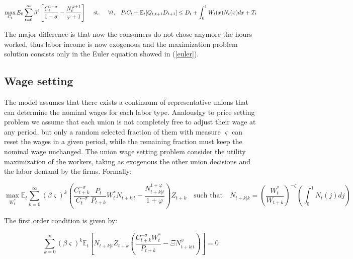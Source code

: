 \documentclass{article}
\newcommand{\Et}{\mathbb{E}_t}
\begin{document}
\begin{equation}
    \max_{C_t} E_0 \sum^\infty_{t=0} \beta^t \left[\frac{C_t^{1-\sigma}}{1-\sigma} - \frac{N_t^{\varphi+1}}{\varphi+1} \right] \hspace{1em}  \textrm{ st. } \hspace{1em} \forall t, \hspace{0.8em} P_t C_t + \Et[Q_{t,t+1} D_{t+1}] \leq D_t +  \int^1_0 W_t(x) N_t(x) dx + T_t
\end{equation}

The major difference is that now the consumers do not chose anymore the hours worked, thus labor income is now exogenous and the maximization problem solution consists only in the Euler equation showed in (\ref{euler}).\\

\subsection{Wage setting}

The model assumes that there exists a continuum of representative unions that can determine the nominal wages for each labor type. Analouslgy to price setting problem we assume that each union is not completely free to adjust their wage at any period, but only a random selected fraction of them with measure $\varsigma$ can reset the wages in a given period, while the remaining fraction must keep the nominal wage unchanged. The union wage setting problem consider the utility maximization of the workers, taking as exogenous the other union decisions and the labor demand by the firms. Formally:

\begin{equation}
    \label{wage_setting}
    \max_{W_t^*} \Et \sum^\infty_{k=0} (\beta \varsigma)^k \left( \frac{C_{t+k}^{-\sigma}}{C_t^{-\sigma}} \frac{P_t}{P_{t+k}} W_t^* N_{t+k|t} - \frac{N_{t+k|t}^{1+\varphi}}{1+\varphi} \right)Z_{t+k} \quad \textrm{such that} \quad N_{t+k|k} = \left(\frac{W_t^*}{W_{t+k}} \right)^{-\zeta} \left(\int_0^1 N_t(j) dj \right)
\end{equation}

The first order condition is given by:

\begin{equation}
    \label{foc_wage}
    \sum^\infty_{k=0} (\beta \varsigma)^k \Et \left[N_{t+k|t} Z_{t+k} \left(\frac{C_{t+k}^{-\sigma} W_t^*}{P_{t+k}} - \Xi N_{t+k|t}^\varphi \right) \right] = 0
\end{equation}
\end{document}
